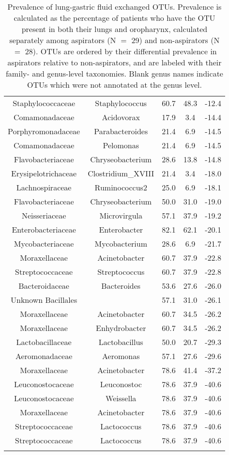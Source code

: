 \begin{center}
\begin{longtable}{ccccc}
	Staphylococcaceae & Staphylococcus & 60.7 & 48.3 & -12.4 \\
	Comamonadaceae & Acidovorax & 17.9 & 3.4 & -14.4 \\
	Porphyromonadaceae & Parabacteroides & 21.4 & 6.9 & -14.5 \\
	Comamonadaceae & Pelomonas & 21.4 & 6.9 & -14.5 \\
	Flavobacteriaceae & Chryseobacterium & 28.6 & 13.8 & -14.8 \\
	Erysipelotrichaceae & Clostridium\_XVIII & 21.4 & 3.4 & -18.0 \\
	Lachnospiraceae & Ruminococcus2 & 25.0 & 6.9 & -18.1 \\
	Flavobacteriaceae & Chryseobacterium & 50.0 & 31.0 & -19.0 \\
	Neisseriaceae & Microvirgula & 57.1 & 37.9 & -19.2 \\
	Enterobacteriaceae & Enterobacter & 82.1 & 62.1 & -20.1 \\
	Mycobacteriaceae & Mycobacterium & 28.6 & 6.9 & -21.7 \\
	Moraxellaceae & Acinetobacter & 60.7 & 37.9 & -22.8 \\
	Streptococcaceae & Streptococcus & 60.7 & 37.9 & -22.8 \\
	Bacteroidaceae & Bacteroides & 53.6 & 27.6 & -26.0 \\
	Unknown Bacillales &  & 57.1 & 31.0 & -26.1 \\
	Moraxellaceae & Acinetobacter & 60.7 & 34.5 & -26.2 \\
	Moraxellaceae & Enhydrobacter & 60.7 & 34.5 & -26.2 \\
	Lactobacillaceae & Lactobacillus & 50.0 & 20.7 & -29.3 \\
	Aeromonadaceae & Aeromonas & 57.1 & 27.6 & -29.6 \\
	Moraxellaceae & Acinetobacter & 78.6 & 41.4 & -37.2 \\
	Leuconostocaceae & Leuconostoc & 78.6 & 37.9 & -40.6 \\
	Leuconostocaceae & Weissella & 78.6 & 37.9 & -40.6 \\
	Moraxellaceae & Acinetobacter & 78.6 & 37.9 & -40.6 \\
	Streptococcaceae & Lactococcus & 78.6 & 37.9 & -40.6 \\
	Streptococcaceae & Lactococcus & 78.6 & 37.9 & -40.6 \\
	\bottomrule
\caption{Prevalence of lung-gastric fluid exchanged OTUs. Prevalence is calculated as the percentage of patients who have the OTU present in both their lungs and oropharynx, calculated separately among aspirators (N $=$ 29) and non-aspirators (N $=$ 28). OTUs are ordered by their differential prevalence in aspirators relative to non-aspirators, and are labeled with their family- and genus-level taxonomies. Blank genus names indicate OTUs which were not annotated at the genus level.}\label{tab:bal-gastric-exchanged}
\end{longtable}
\end{center}

